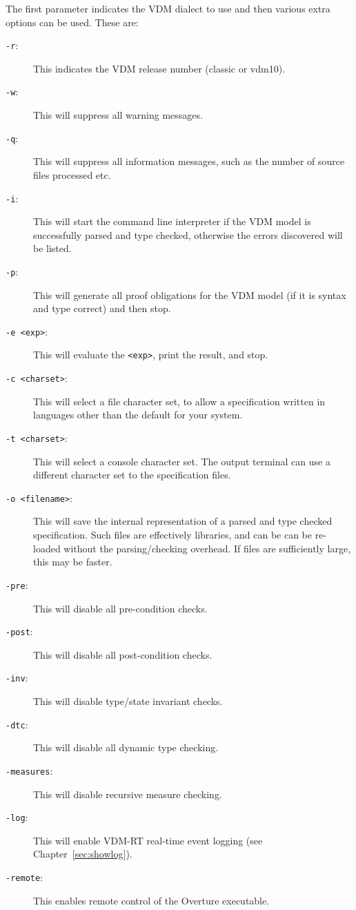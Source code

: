 \documentclass{overturerepchap}
\begin{document}
The first parameter indicates the VDM dialect to use and then
various extra options can be used. These are:

\begin{description}
\item[\texttt{-r}:] This indicates the VDM release number (classic or vdm10).
\item[\texttt{-w}:] This will suppress all warning messages.
\item[\texttt{-q}:] This will suppress all information messages, such as
 the number of source files processed etc.
\item[\texttt{-i}:] This will start the command line interpreter if the VDM
  model is successfully parsed and type checked, otherwise the errors discovered
  will be listed.
\item[\texttt{-p}:] This will generate all proof obligations for the
  VDM model (if it is syntax and type correct) and then stop.
\item[\texttt{-e <exp>}:] This will evaluate the \texttt{<exp>}, print
  the result, and stop.
\item[\texttt{-c <charset>}:] This will select a file character set, to
allow a specification written in languages other than the default for your system.
\item[\texttt{-t <charset>}:] This will select a console character set. The output
terminal can use a different character set to the specification files.
\item[\texttt{-o <filename>}:] This will save the internal
  representation of a parsed and type checked spe\-ci\-fication. Such files are
  effectively libraries, and can be can be re-loaded without the
  parsing/checking overhead. If files are sufficiently large, this may be faster.
\item[\texttt{-pre}:] This will disable all pre-condition checks.
\item[\texttt{-post}:] This will disable all post-condition checks.
\item[\texttt{-inv}:] This will disable type/state invariant checks.
\item[\texttt{-dtc}:] This will disable all dynamic type checking.
\item[\texttt{-measures}:] This will disable recursive measure checking.
\item[\texttt{-log}:] This will enable VDM-RT real-time event logging (see Chapter~\ref{sec:showlog}).
\item[\texttt{-remote}:] This enables remote control of the Overture executable.
\end{description}
\end{document}
